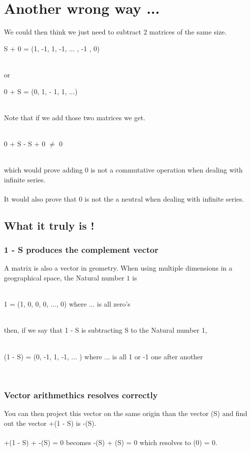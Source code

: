 \documentclass{article}
\begin{document}
  \section{Another wrong way ...}
    We could then think we just need to subtract 2 matrices of the same size.
    ~\\
    \centerline{
    S + 0 = (1, -1, 1, -1, ... , -1 , 0)
    }
    ~\\
    or  
    ~\\
    \centerline{
    0 + S = (0, 1, - 1, 1, ...)
    }
    ~\\
    Note that if we add those two matrices we get.
    ~\\
    ~\\
    \centerline{
    0 + S - S + 0 $\neq$ 0
    }
    ~\\
    which would prove adding 0 is not a commutative operation when dealing with infinite series.
    ~\\
    ~\\
    It would also prove that 0 is not the a neutral when dealing with infinite series.
    \subsection{What it truly is !}
      \subsubsection{1 - S produces the complement vector}
        A matrix is also a vector in geometry. When using multiple dimensions in a geographical space, the Natural number $1$ is
        ~\\
        ~\\
        \centerline{
        1 = (1, 0, 0, 0, ..., 0) where ... is all zero's
        }
        ~\\
        then, if we say that 1 - S is subtracting S to the Natural number 1,
        ~\\
        ~\\
        \centerline{
        (1 - S) = (0, -1, 1, -1, ... ) where ... is all 1 or -1 one after another 
        }
        ~\\
      \subsubsection{Vector arithmethics resolves correctly}
        You can then project this vector on the same origin than the vector (S) and find out the vector +(1 - S) is -(S).
        ~\\
        ~\\
        +(1 - S) + -(S) = 0 becomes -(S) + (S) = 0 which resolves to (0) = 0.
\end{document}
